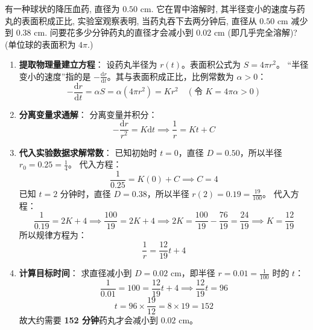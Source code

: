 \documentclass[lang=cn,11pt]{elegantbook}
\begin{document}
\begin{exercise}[微分方程在物理化学中的应用]
有一种球状的降压血药, 直径为 $0.50 \text{ cm}$. 它在胃中溶解时, 其半径变小的速度与药丸的表面积成正比, 实验室观察表明, 当药丸吞下去两分钟后, 直径从 $0.50 \text{ cm}$ 减少到 $0.38 \text{ cm}$. 问要花多少分钟药丸的直径才会减小到 $0.02 \text{ cm}$ (即几乎完全溶解)? (单位球的表面积为 $4\pi$.)
\end{exercise}
\begin{solution}
\begin{enumerate}
    \item \textbf{提取物理量建立方程}：
    设药丸半径为 $r(t)$。表面积公式为 $S = 4\pi r^2$。
    “半径变小的速度”指的是 $-\frac{\mathrm{d}r}{\mathrm{d}t}$。其与表面积成正比，比例常数为 $\alpha > 0$：
    \[
    -\frac{\mathrm{d}r}{\mathrm{d}t} = \alpha S = \alpha (4\pi r^2) = K r^2 \quad (\text{令 } K = 4\pi\alpha > 0)
    \]
    
    \item \textbf{分离变量求通解}：
    分离变量并积分：
    \[
    -\frac{\mathrm{d}r}{r^2} = K \mathrm{d}t \implies \frac{1}{r} = Kt + C
    \]
    
    \item \textbf{代入实验数据求解常数}：
    已知初始时 $t=0$，直径 $D = 0.50$，所以半径 $r_0 = 0.25 = \frac{1}{4}$。
    代入方程：
    \[
    \frac{1}{0.25} = K(0) + C \implies C = 4
    \]
    已知 $t=2$ 分钟时，直径 $D = 0.38$，所以半径 $r(2) = 0.19 = \frac{19}{100}$。
    代入方程：
    \[
    \frac{1}{0.19} = 2K + 4 \implies \frac{100}{19} = 2K + 4 \implies 2K = \frac{100}{19} - \frac{76}{19} = \frac{24}{19} \implies K = \frac{12}{19}
    \]
    所以规律方程为：
    \[
    \frac{1}{r} = \frac{12}{19} t + 4
    \]
    
    \item \textbf{计算目标时间}：
    求直径减小到 $D = 0.02 \text{ cm}$，即半径 $r = 0.01 = \frac{1}{100}$ 时的 $t$：
    \[
    \frac{1}{0.01} = 100 = \frac{12}{19} t + 4 \implies \frac{12}{19} t = 96
    \]
    \[
    t = 96 \times \frac{19}{12} = 8 \times 19 = 152
    \]
    故大约需要 \textbf{152 分钟}药丸才会减小到 $0.02 \text{ cm}$。
\end{enumerate}
\end{solution}
\end{document}
